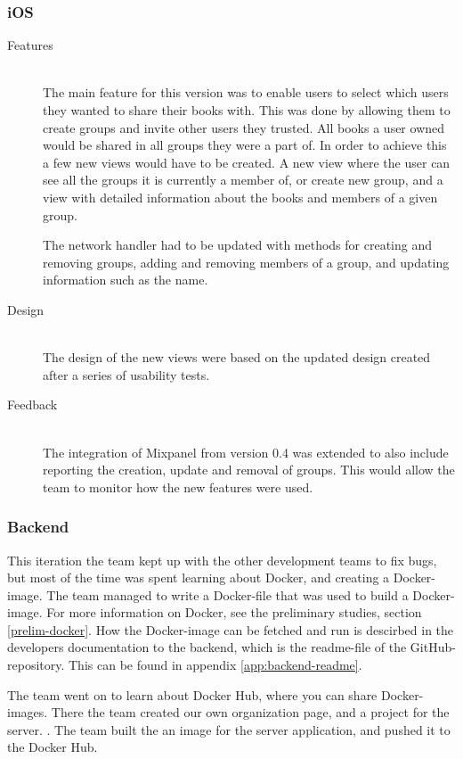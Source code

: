 \subsubsection{iOS}
\begin{description}
    \item[Features] \hfill\\
The main feature for this version was to enable users to select which users they wanted to share their books with. This was done by allowing them to create groups and invite other users they trusted. All books a user owned would be shared in all groups they were a part of. In order to achieve this a few new views would have to be created. A new view where the user can see all the groups it is currently a member of, or create new group, and a view with detailed information about the books and members of a given group. 

The network handler had to be updated with methods for creating and removing groups, adding and removing members of a group, and updating information such as the name. 

    \item[Design] \hfill\\
The design of the new views were based on the updated design created after a series of usability tests.

    \item[Feedback] \hfill\\
The integration of Mixpanel from version 0.4 was extended to also include reporting the creation, update and removal of groups. This would allow the team to monitor how the new features were used.
\end{description}

\subsubsection{Backend}
\label{sec:backend-v0.4}
This iteration the team kept up with the other development teams to fix bugs, but most of the time was spent learning about Docker, and creating a Docker-image. \cite{docker} The team managed to write a Docker-file that was used to build a Docker-image. For more information on Docker, see the preliminary studies, section \ref{prelim-docker}. How the Docker-image can be fetched and run is descirbed in the developers documentation to the backend, which is the readme-file of the GitHub-repository. This can be found in appendix \ref{app:backend-readme}.

The team went on to learn about Docker Hub, where you can share Docker-images. \cite{dockerhub} There the team created our own organization page, and a project for the server. \cite{dockerhub-crowdshelf}. The team built the an image for the server application, and pushed it to the Docker Hub. 

